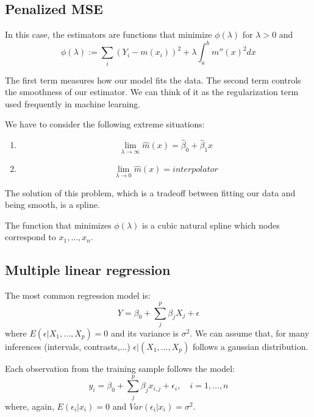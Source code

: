 \subsection{Penalized MSE}

In this case, the estimators are functions that minimize \(\phi(\lambda)\) for \(\lambda > 0\) and
\[
\phi(\lambda):= \sum_{i}(Y_{i} - m(x_{i}))^{2} + \lambda \int_{a}^{b} m''(x)^{2} dx
\]

The first term measures how our model fits the data. The second term controls the smoothness of our estimator. We can think of it as the regularization term used frequently in machine learning.

We have to consider the following extreme situations:

\begin{enumerate}
  \item \[
        \lim_{\lambda \to \infty} \hat m(x) = \hat \beta_{0} + \hat \beta_{1}x
        \]
  \item
        \[
        \lim_{\lambda \to 0} \hat m(x) = interpolator
        \]
\end{enumerate}

\begin{remark}
The solution of this problem, which is a tradeoff between fitting our data and being smooth, is a spline.
\end{remark}

\begin{nprop}
The function that minimizes \(\phi(\lambda)\) is a cubic natural spline which nodes correspond to \(x_1,\dots,x_n\).
\end{nprop}

\subsection{Multiple linear regression}

The most common regression model is:
\[
Y = \beta_{0} + \sum_{j}^{p} \beta_{j}X_{j} + \epsilon
\]
where \(E(\epsilon | X_{1},\dots,X_{p}) = 0\) and its variance is \(\sigma^2\). We can assume that, for many inferences (intervals, contrasts,...) \(\epsilon|(X_{1},\dots,X_{p})\) follows a gaussian distribution.

Each observation from the training sample follows the model:
\[
y_{i} = \beta_{0} + \sum_{j}^{p} \beta_{j}x_{i,j} + \epsilon_{i}, \quad i = 1,\dots,n
\]
where, again, \(E(\epsilon_{i}|x_{i}) = 0\) and \(Var(\epsilon_{i}|x_{i}) = \sigma^{2}\).

